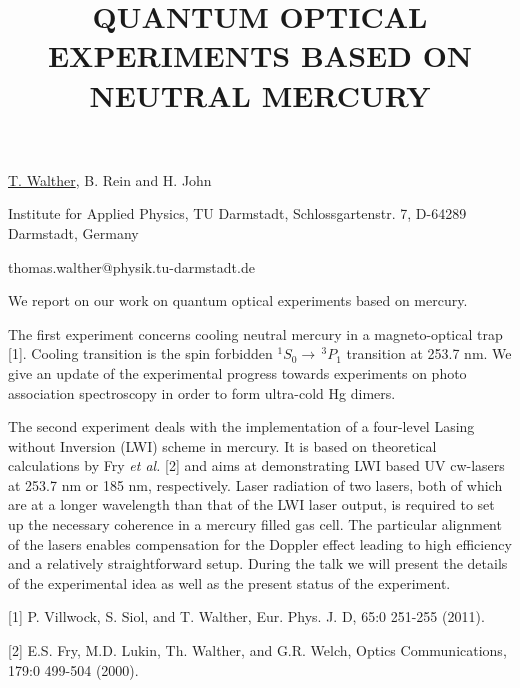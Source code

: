 \title{QUANTUM OPTICAL EXPERIMENTS BASED ON NEUTRAL MERCURY}

\underline{T. Walther}, B. Rein and H. John

{\normalsize{\vspace{-4mm}
Institute for Applied Physics, TU Darmstadt, Schlossgartenstr. 7, D-64289 Darmstadt, Germany

\email thomas.walther@physik.tu-darmstadt.de}}

We report on our work on quantum optical experiments based on mercury.

The first experiment concerns cooling neutral mercury in a magneto-optical trap [1]. Cooling transition is the spin forbidden $^1S_0\rightarrow \,^3P_1$ transition at 253.7 nm.  We give an update of the experimental progress towards experiments on photo association spectroscopy in order to form ultra-cold Hg dimers.

The second experiment deals with the implementation of a four-level Lasing without Inversion (LWI) scheme in mercury. It is based on theoretical calculations by Fry {\it et al.} [2] and aims at demonstrating LWI based UV cw-lasers at 253.7 nm or 185 nm, respectively. Laser radiation of two lasers, both of which are at a longer wavelength than that of the LWI laser output, is required to set up the necessary coherence in a mercury filled gas cell. The particular alignment of the lasers enables compensation for the Doppler effect leading to high efficiency and a relatively straightforward setup. During the talk we will present the details of the experimental idea as well as the present status of the experiment.

{\normalsize
[1] P. Villwock, S. Siol, and T. Walther, Eur. Phys. J. D, 65:0 251-255 (2011).
\vsp

[2] E.S. Fry, M.D. Lukin, Th. Walther, and G.R. Welch, Optics Communications, 179:0 499-504 (2000).
}

\vspace{\baselineskip} 